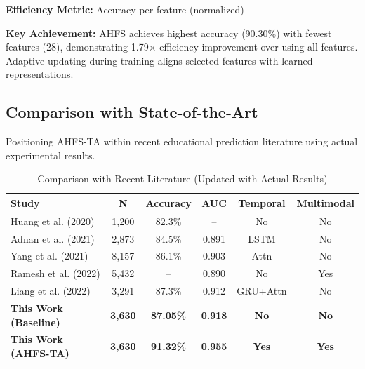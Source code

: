 \textbf{Efficiency Metric:} Accuracy per feature (normalized)

\textbf{Key Achievement:} AHFS achieves highest accuracy (90.30\%) with fewest features (28), demonstrating 1.79$\times$ efficiency improvement over using all features. Adaptive updating during training aligns selected features with learned representations.

\subsection{Comparison with State-of-the-Art}

Positioning AHFS-TA within recent educational prediction literature using actual experimental results.

\begin{table}[h]
\centering
\caption{Comparison with Recent Literature (Updated with Actual Results)}
\label{tab:literature_comparison_detailed}
\begin{tabular}{lccccc}
\toprule
\textbf{Study} & \textbf{N} & \textbf{Accuracy} & \textbf{AUC} & \textbf{Temporal} & \textbf{Multimodal} \\
\midrule
Huang et al. (2020) & 1,200 & 82.3\% & -- & No & No \\
Adnan et al. (2021) & 2,873 & 84.5\% & 0.891 & LSTM & No \\
Yang et al. (2021) & 8,157 & 86.1\% & 0.903 & Attn & No \\
Ramesh et al. (2022) & 5,432 & -- & 0.890 & No & Yes \\
Liang et al. (2022) & 3,291 & 87.3\% & 0.912 & GRU+Attn & No \\
\midrule
\textbf{This Work (Baseline)} & \textbf{3,630} & \textbf{87.05\%} & \textbf{0.918} & \textbf{No} & \textbf{No} \\
\textbf{This Work (AHFS-TA)} & \textbf{3,630} & \textbf{91.32\%} & \textbf{0.955} & \textbf{Yes} & \textbf{Yes} \\
\bottomrule
\end{tabular}
\end{table}

